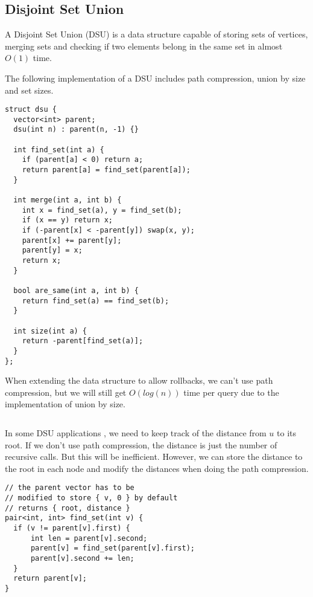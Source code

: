 \subsection{Disjoint Set Union}

A Disjoint Set Union (DSU) is a data structure capable of storing sets of vertices,
merging sets and checking if two elements belong in the same set in almost $O(1)$ time.
\cite{DSUCPAlgo}
\newline

\begin{center}
\begin{minipage}[t]{0.45\linewidth}
The following implementation of a DSU includes path compression, union by size and set sizes.
\begin{lstlisting}
struct dsu {
  vector<int> parent;
  dsu(int n) : parent(n, -1) {}

  int find_set(int a) {
    if (parent[a] < 0) return a;
    return parent[a] = find_set(parent[a]);
  }

  int merge(int a, int b) {
    int x = find_set(a), y = find_set(b);
    if (x == y) return x;
    if (-parent[x] < -parent[y]) swap(x, y);
    parent[x] += parent[y];
    parent[y] = x;
    return x;
  }

  bool are_same(int a, int b) {
    return find_set(a) == find_set(b);
  }

  int size(int a) {
    return -parent[find_set(a)];
  }
};
\end{lstlisting}
\end{minipage}
\qquad
\begin{minipage}[t]{0.45\linewidth}
When extending the data structure to allow rollbacks,
we can't use path compression, but we will still get $O(log(n))$
time per query due to the implementation of union by size.
\begin{lstlisting}
\end{lstlisting}
\end{minipage}
\end{center}

In some DSU applications \cite{DSUCPAlgo}, we need to keep track of the distance from $u$
to its root. If we don't use path compression, the distance is just the number
of recursive calls. But this will be inefficient. However, we can store
the distance to the root in each node and modify the distances when doing the path compression.

\begin{lstlisting}
// the parent vector has to be 
// modified to store { v, 0 } by default
// returns { root, distance }
pair<int, int> find_set(int v) {
  if (v != parent[v].first) {
      int len = parent[v].second;
      parent[v] = find_set(parent[v].first);
      parent[v].second += len;
  }
  return parent[v];
}
\end{lstlisting}

